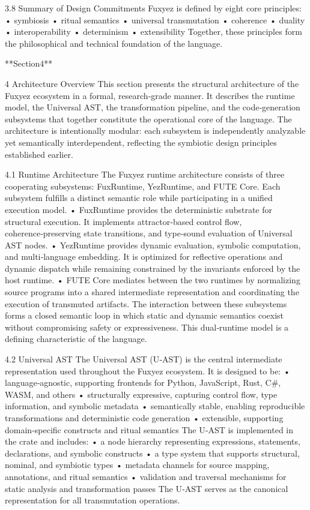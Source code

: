 3.8 Summary of Design Commitments
Fuxyez is defined by eight core principles:
• 	symbiosis
• 	ritual semantics
• 	universal transmutation
• 	coherence
• 	duality
• 	interoperability
• 	determinism
• 	extensibility
Together, these principles form the philosophical and technical foundation of the language.

**Section4**

4 Architecture Overview
This section presents the structural architecture of the Fuxyez ecosystem in a formal, research‑grade manner. It describes the runtime model, the Universal AST, the transformation pipeline, and the code‑generation subsystems that together constitute the operational core of the language. The architecture is intentionally modular: each subsystem is independently analyzable yet semantically interdependent, reflecting the symbiotic design principles established earlier.

4.1 Runtime Architecture
The Fuxyez runtime architecture consists of three cooperating subsystems: FuxRuntime, YezRuntime, and FUTE Core. Each subsystem fulfills a distinct semantic role while participating in a unified execution model.
• 	FuxRuntime provides the deterministic substrate for structural execution. It implements attractor‑based control flow, coherence‑preserving state transitions, and type‑sound evaluation of Universal AST nodes.
• 	YezRuntime provides dynamic evaluation, symbolic computation, and multi‑language embedding. It is optimized for reflective operations and dynamic dispatch while remaining constrained by the invariants enforced by the host runtime.
• 	FUTE Core mediates between the two runtimes by normalizing source programs into a shared intermediate representation and coordinating the execution of transmuted artifacts.
The interaction between these subsystems forms a closed semantic loop in which static and dynamic semantics coexist without compromising safety or expressiveness. This dual‑runtime model is a defining characteristic of the language.

4.2 Universal AST
The Universal AST (U‑AST) is the central intermediate representation used throughout the Fuxyez ecosystem. It is designed to be:
• 	language‑agnostic, supporting frontends for Python, JavaScript, Rust, C#, WASM, and others
• 	structurally expressive, capturing control flow, type information, and symbolic metadata
• 	semantically stable, enabling reproducible transformations and deterministic code generation
• 	extensible, supporting domain‑specific constructs and ritual semantics
The U‑AST is implemented in the  crate and includes:
• 	a node hierarchy representing expressions, statements, declarations, and symbolic constructs
• 	a type system that supports structural, nominal, and symbiotic types
• 	metadata channels for source mapping, annotations, and ritual semantics
• 	validation and traversal mechanisms for static analysis and transformation passes
The U‑AST serves as the canonical representation for all transmutation operations.

